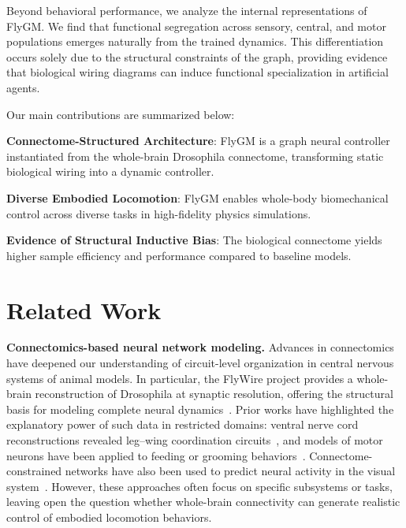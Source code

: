 \documentclass{article}
\theoremstyle{plain}
\theoremstyle{definition}
\theoremstyle{remark}
\begin{document}
Beyond behavioral performance, we analyze the internal representations of FlyGM. We find that functional segregation across sensory, central, and motor populations emerges naturally from the trained dynamics. This differentiation occurs solely due to the structural constraints of the graph, providing evidence that biological wiring diagrams can induce functional specialization in artificial agents.

Our main contributions are summarized below:

\textbf{Connectome-Structured Architecture}: FlyGM is a graph neural controller instantiated from the whole-brain Drosophila connectome, transforming static biological wiring into a dynamic controller.

\textbf{Diverse Embodied Locomotion}: FlyGM enables whole-body biomechanical control across diverse tasks in high-fidelity physics simulations.

\textbf{Evidence of Structural Inductive Bias}: The biological connectome yields higher sample efficiency and performance compared to baseline models.

\section{Related Work}

\textbf{Connectomics-based neural network modeling.} Advances in connectomics have deepened our understanding of circuit-level organization in central nervous systems of animal models. In particular, the FlyWire project provides a whole-brain reconstruction of Drosophila at synaptic resolution, offering the structural basis for modeling complete neural dynamics~\citep{Dorkenwald2024a,Schlegel2024a,Zheng2018a}. Prior works have highlighted the explanatory power of such data in restricted domains: ventral nerve cord reconstructions revealed leg–wing coordination circuits~\citep{Azevedo2024,Lesser2024}, and models of motor neurons have been applied to feeding or grooming behaviors~\citep{Shiu2024}. Connectome-constrained networks have also been used to predict neural activity in the visual system~\citep{Lappalainen2024}. However, these approaches often focus on specific subsystems or tasks, leaving open the question whether whole-brain connectivity can generate realistic control of embodied locomotion behaviors.
\end{document}

